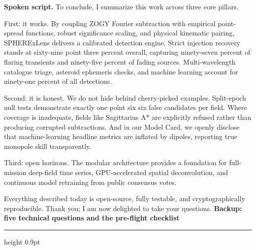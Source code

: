 \documentclass[11pt,a4paper]{article}
\begin{document}
\textbf{Spoken script.} To conclude, I summarize this work across three core pillars.

First: it works. By coupling ZOGY Fourier subtraction with empirical point-spread functions, robust significance scaling, and physical kinematic pairing, SPHERExLens delivers a calibrated detection engine. Strict injection recovery stands at sixty-nine point three percent overall, capturing ninety-seven percent of flaring transients and ninety-five percent of fading sources. Multi-wavelength catalogue triage, asteroid ephemeris checks, and machine learning account for ninety-one percent of all detections.

Second: it is honest. We do not hide behind cherry-picked examples. Split-epoch null tests demonstrate exactly one point six six false candidates per field. Where coverage is inadequate, fields like Sagittarius A* are explicitly refused rather than producing corrupted subtractions. And in our Model Card, we openly disclose that machine-learning headline metrics are inflated by dipoles, reporting true monopole skill transparently.

Third: open horizons. The modular architecture provides a foundation for full-mission deep-field time series, GPU-accelerated spatial deconvolution, and continuous model retraining from public consensus votes.

Everything described today is open-source, fully testable, and cryptographically reproducible. Thank you; I am now delighted to take your questions.
\newpage
{\large\bfseries Backup: five technical questions and the pre-flight checklist}\par
\vspace{2pt}\hrule height 0.9pt\vspace{8pt}
\end{document}
